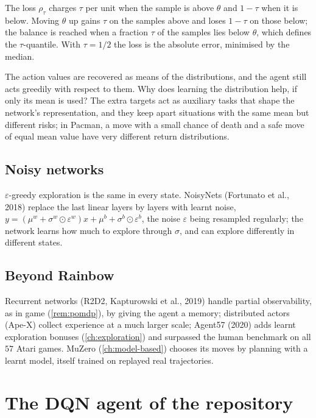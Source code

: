 \begin{intuition}
  The loss $\rho_\tau$ charges $\tau$ per unit when the sample is above
  $\theta$ and $1 - \tau$ when it is below. Moving $\theta$ up gains $\tau$
  on the samples above and loses $1 - \tau$ on those below; the balance is
  reached when a fraction $\tau$ of the samples lies below $\theta$, which
  defines the $\tau$-quantile. With $\tau = 1/2$ the loss is the absolute
  error, minimised by the median.
\end{intuition}

The action values are recovered as means of the distributions, and the
agent still acts greedily with respect to them. Why does learning the
distribution help, if only its mean is used? The extra targets act as
auxiliary tasks that shape the network's representation, and they keep
apart situations with the same mean but different risks; in Pacman, a
move with a small chance of death and a safe move of equal mean value
have very different return distributions.

\subsection{Noisy networks}

$\varepsilon$-greedy exploration is the same in every state. NoisyNets
(Fortunato et al., 2018) replace the last linear layers by layers with
learnt noise, $y = (\mu^w + \sigma^w \odot \varepsilon^w) x + \mu^b +
\sigma^b \odot \varepsilon^b$, the noise $\varepsilon$ being resampled
regularly; the network learns how much to explore through $\sigma$, and
can explore differently in different states.

\subsection{Beyond Rainbow}

Recurrent networks (R2D2, Kapturowski et al., 2019) handle partial
observability, as in game  (\cref{rem:pomdp}), by giving the
agent a memory; distributed actors (Ape-X) collect experience at a much
larger scale; Agent57 (2020) adds learnt exploration bonuses
(\cref{ch:exploration}) and surpassed the human benchmark on all $57$
Atari games. MuZero (\cref{ch:model-based}) chooses its moves by planning
with a learnt model, itself trained on replayed real trajectories.

\section{The DQN agent of the repository}

